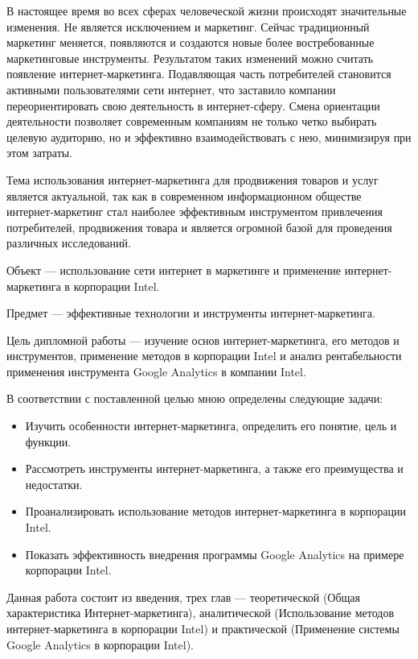 \documentclass[a4paper,english,russian]{G2-105}
\begin{document}
\par В настоящее время во всех сферах человеческой жизни происходят значительные изменения. Не является исключением и маркетинг. Сейчас традиционный маркетинг меняется, появляются и создаются новые более востребованные маркетинговые инструменты. Результатом таких изменений можно считать появление интернет-маркетинга. Подавляющая часть потребителей становится активными пользователями сети интернет, что заставило компании переориентировать свою деятельность в интернет-сферу. Смена ориентации деятельности позволяет современным компаниям не только четко выбирать целевую аудиторию, но и эффективно взаимодействовать с нею, минимизируя при этом затраты.
\par Тема использования интернет-маркетинга для продвижения товаров и услуг является актуальной, так как в современном информационном обществе интернет-маркетинг стал наиболее эффективным инструментом привлечения потребителей, продвижения товара и является огромной базой для проведения различных исследований.
\par Объект --- использование сети интернет в маркетинге и применение интернет-маркетинга в корпорации Intel.
\par Предмет --- эффективные технологии и инструменты интернет-маркетинга.
\par Цель дипломной работы --- изучение основ интернет-маркетинга, его методов и инструментов, применение методов в корпорации Intel и анализ рентабельности применения инструмента Google Analytics в компании Intel.
\par В соответствии с поставленной целью мною определены следующие задачи:
\begin{itemize}
	\item Изучить особенности интернет-маркетинга, определить его понятие, цель и функции.
	\item Рассмотреть инструменты интернет-маркетинга, а также его преимущества и недостатки.
	\item Проанализировать использование методов интернет-маркетинга в корпорации Intel.
	\item Показать эффективность внедрения программы Google Analytics на примере корпорации Intel.
\end{itemize}
\par Данная работа состоит из введения, трех глав --- теоретической (Общая характеристика Интернет-маркетинга), аналитической (Использование методов интернет-маркетинга в корпорации Intel) и практической (Применение системы Google Analytics в корпорации Intel).
\end{document}
